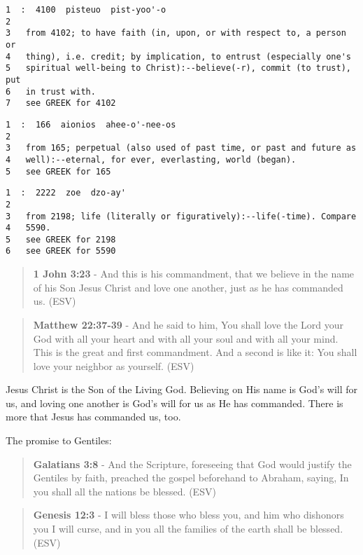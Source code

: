 \documentclass[11pt]{article}
\begin{document}
\begin{verbatim}
1  :  4100  pisteuo  pist-yoo'-o
2  
3   from 4102; to have faith (in, upon, or with respect to, a person or
4   thing), i.e. credit; by implication, to entrust (especially one's
5   spiritual well-being to Christ):--believe(-r), commit (to trust), put
6   in trust with.
7   see GREEK for 4102
\end{verbatim}

\begin{verbatim}
1  :  166  aionios  ahee-o'-nee-os
2  
3   from 165; perpetual (also used of past time, or past and future as
4   well):--eternal, for ever, everlasting, world (began).
5   see GREEK for 165
\end{verbatim}

\begin{verbatim}
1  :  2222  zoe  dzo-ay'
2  
3   from 2198; life (literally or figuratively):--life(-time). Compare
4   5590.
5   see GREEK for 2198
6   see GREEK for 5590
\end{verbatim}

\begin{quote}
\textbf{1 John 3:23} - And this is his commandment, that we believe in the name of his Son Jesus Christ and love one another, just as he has commanded us. (ESV)
\end{quote}

\begin{quote}
\textbf{Matthew 22:37-39} - And he said to him, You shall love the Lord your God with all your heart and with all your soul and with all your mind. This is the great and first commandment. And a second is like it: You shall love your neighbor as yourself. (ESV)
\end{quote}

Jesus Christ is the Son of the Living God. Believing on His name is God's will for us, and loving one another is God's will for us as He has commanded. There is more that Jesus has commanded us, too.

The promise to Gentiles:

\begin{quote}
\textbf{Galatians 3:8} - And the Scripture, foreseeing that God would justify the Gentiles by faith, preached the gospel beforehand to Abraham, saying, In you shall all the nations be blessed. (ESV)
\end{quote}

\begin{quote}
\textbf{Genesis 12:3} - I will bless those who bless you, and him who dishonors you I will curse, and in you all the families of the earth shall be blessed. (ESV)
\end{quote}
\end{document}
